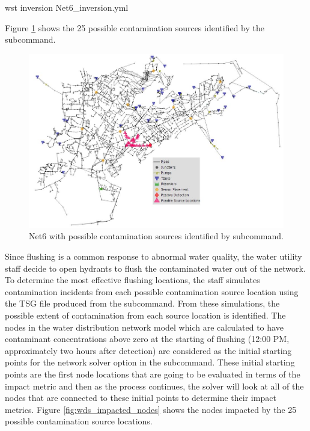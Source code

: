 \begin{unknownListing}
wst inversion Net6_inversion.yml
\end{unknownListing}  

Figure \ref{fig:wds_sources} shows the 25 possible contamination sources identified by the 
 subcommand.  

\begin{figure}[h!]
\begin{center}
\includegraphics[scale=0.6]{graphics/Net6_possible_sources.JPG}
\caption{Net6 with possible contamination sources identified by  subcommand.}
\label{fig:wds_sources}
\end{center}
\end{figure}

Since flushing is a common response to abnormal water quality, the water utility staff decide 
to open hydrants to flush the contaminated water out of the network. To determine the most 
effective flushing locations, the staff simulates contamination incidents from each 
possible contamination source location using the TSG file produced from the  subcommand. 
From these simulations, the possible extent of contamination from each source location is identified. 
The nodes in the water distribution network model which are calculated to have 
contaminant concentrations above zero at the starting of flushing (12:00 PM, 
approximately two hours after detection) are considered as the initial starting points for the network 
solver option in the  subcommand. These initial starting points 
are the first node locations that are going to be evaluated in terms of the impact metric  
and then as the process continues, the solver will look at all of the nodes that are 
connected to these initial points to determine their impact metrics. Figure \ref{fig:wds_impacted_nodes} 
shows the nodes impacted by the 25 possible contamination source locations.  

